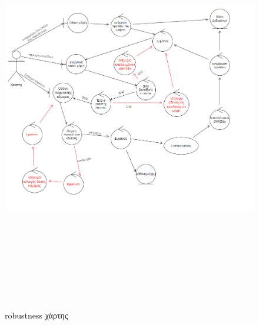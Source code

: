 \begin{figure}[!htb]
  \centering
    \centering
    \includegraphics[width=18cm,height=18cm]{robust_map.png}
    \caption{robustness χάρτης}
    \label{}
\end{figure}
